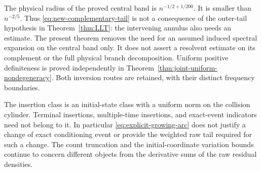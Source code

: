 \begin{remark}
\label{rem:growing-arc-boundary}
The physical radius of the proved central band is
$n^{-1/2+1/200}$. It is smaller than $n^{-2/5}$. Thus
\eqref{eq:new-complementary-tail} is not a consequence of the outer-tail
hypothesis in Theorem~\ref{thm:LLT}: the intervening annulus also needs
an estimate. The present theorem removes the need for an assumed induced
spectral expansion on the central band only. It does not assert a
resolvent estimate on its complement or the full physical branch
decomposition. Uniform positive definiteness is proved independently
in Theorem~\ref{thm:joint-uniform-nondegeneracy}. Both inversion routes are
retained, with their distinct frequency boundaries.

The insertion class is an initial-state class with a uniform norm on
the collision cylinder. Terminal insertions, multiple-time insertions,
and exact-event indicators need not belong to it. In particular
\eqref{eq:explicit-growing-arc} does not justify a change of exact
conditioning event or provide the weighted raw tail required for such
a change. The count truncation and the initial-coordinate variation
bounds continue to concern different objects from the derivative sums
of the raw residual densities.
\end{remark}
